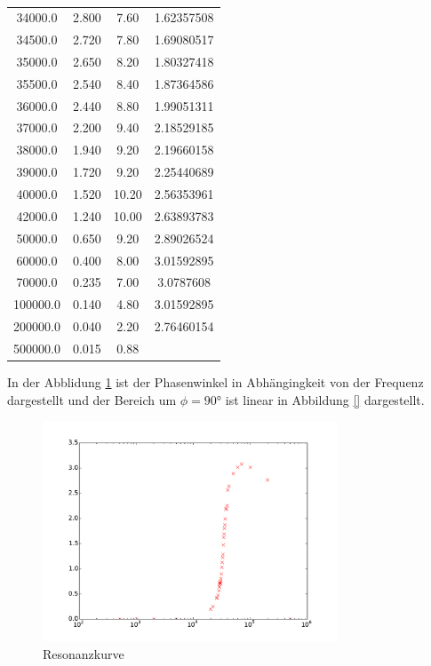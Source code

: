 \begin{table}
\begin{tabular}{c c c c}
       34000.0  &  2.800  &  7.60  & 1.62357508\\
       34500.0  &  2.720  &  7.80  & 1.69080517\\
       35000.0  &  2.650  &  8.20  & 1.80327418\\
       35500.0  &  2.540  &  8.40  & 1.87364586\\
       36000.0  &  2.440  &  8.80  & 1.99051311\\
       37000.0  &  2.200  &  9.40  & 2.18529185\\
       38000.0  &  1.940  &  9.20  & 2.19660158\\
       39000.0  &  1.720  &  9.20  & 2.25440689\\
       40000.0  &  1.520  & 10.20  & 2.56353961\\
       42000.0  &  1.240  & 10.00  & 2.63893783\\
       50000.0  &  0.650  &  9.20  & 2.89026524\\
       60000.0  &  0.400  &  8.00  & 3.01592895\\
       70000.0  &  0.235  &  7.00  & 3.0787608 \\
      100000.0  &  0.140  &  4.80  & 3.01592895\\
      200000.0  &  0.040  &  2.20  & 2.76460154\\
      500000.0  &  0.015  &  0.88  & \\
  \end{tabular}
  \caption{}
  \label{fig:Messwerte}
\end{table}
In der Abblidung \ref{fig:phasenverschiebung} ist der Phasenwinkel in Abhängingkeit
von der Frequenz dargestellt und der Bereich um $\phi=90°$ ist linear in Abbildung
\ref{} dargestellt.
\begin{figure}
  \centering
  \includegraphics[width=0.78\textwidth]{phasenverschiebung.pdf}
  \caption{Resonanzkurve}
  \label{fig:phasenverschiebung}
\end{figure}
